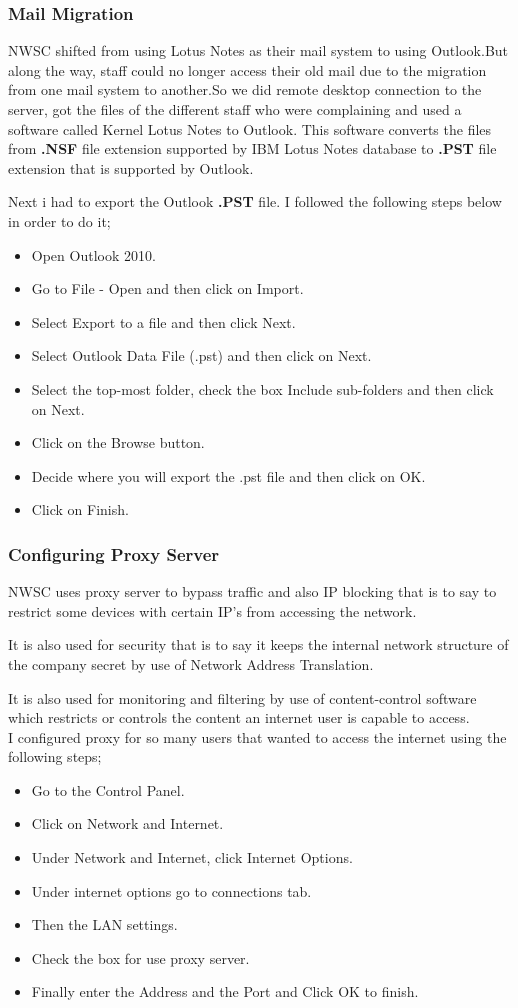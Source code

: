 \documentclass{article}
\begin{document}
\subsubsection{Mail Migration}
NWSC shifted from using Lotus Notes as their mail system to using Outlook.But along the way, staff could no longer access their old mail due to the migration from one mail system to another.So we did remote desktop connection to the server, got the files of the different staff who were complaining and used a software called Kernel Lotus Notes to Outlook. This software converts the files from \textbf{.NSF} file extension supported by IBM Lotus Notes database to \textbf{.PST} file extension that is supported by Outlook.
\par Next i had to export the Outlook \textbf{.PST} file. I followed the following steps below in order to do it;
\begin{itemize}
\item Open Outlook 2010.
\item Go to File - Open and then click on Import.
\item Select Export to a file and then click Next.
\item Select Outlook Data File (.pst) and then click on Next.
\item Select the top-most folder, check the box Include sub-folders and then click on Next.
\item Click on the Browse button.
\item Decide where you will export the .pst file and then click on OK.
\item Click on Finish.
\end{itemize}
\subsubsection{Configuring Proxy Server}
NWSC uses proxy server to bypass traffic and also IP blocking that is to say to restrict some devices with certain IP's from accessing the network.
\par It is also used for security that is to say it keeps the internal network  structure of the company secret by use of Network Address Translation.
\par It is also used for monitoring and filtering by use of content-control software which restricts or controls the content an internet user is capable to access.\\
I configured proxy for so many users that wanted to access the internet using the following steps;
\begin{itemize}
\item Go to the Control Panel.
\item Click on Network and Internet.
\item Under Network and Internet, click Internet Options.
\item Under internet options go to connections tab.
\item Then the LAN settings.
\item Check the box for use proxy server.
\item Finally enter the Address and the Port and Click OK to finish.
\end{itemize}
\end{document}

